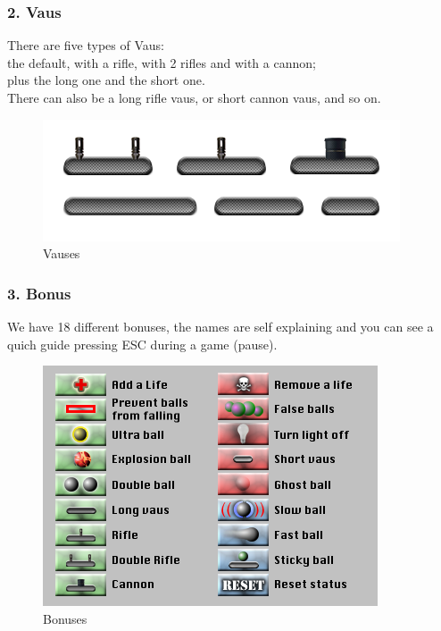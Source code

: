 \documentclass[12pt]{article}
\begin{document}
\subsubsection*{2. Vaus}
There are five types of Vaus:\\
the default, with a rifle, with 2 rifles and with a cannon;\\
plus the long one and the short one.\\
There can also be a long rifle vaus, or short cannon vaus, and so on.\\

\begin{figure}[htbp]
  \centering
    \includegraphics[scale=0.7]{vauses.png}
  \caption{Vauses}
  \label{buddies}
\end{figure}

\subsubsection*{3. Bonus}
We have 18 different bonuses, the names are self explaining and you can see a quich guide pressing ESC during a game (pause).\\
\begin{figure}[htbp]
  \centering
    \includegraphics[scale=0.7]{bonuses.png}
  \caption{Bonuses}
  \label{buddies}
\end{figure}
\end{document}
